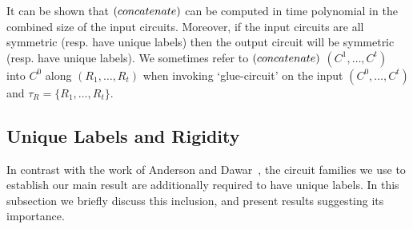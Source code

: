 \documentclass[../paper.tex]{subfiles}
\begin{document}

It can be shown that $\text{\upshape (} concatenate)$ can be computed in time polynomial in
the combined size of the input circuits. Moreover, if the input circuits are all
symmetric (resp. have unique labels) then the output circuit will be symmetric
(resp. have unique labels). We sometimes refer to $\text{\upshape (} concatenate)$ $(C^1,
\ldots, C^t)$ into $C^0$ along $(R_1 , \ldots , R_t)$ when invoking
`glue-circuit' on the input $(C^0, \ldots , C^t)$ and $\tau_R = \{R_1, \ldots ,
R_t\}$.

\subsection{Unique Labels and Rigidity}
In contrast with the work of Anderson and Dawar~\cite{}, the circuit families we
use to establish our main result are additionally required to have unique
labels. In this subsection we briefly discuss this inclusion, and present
results suggesting its importance.
\end{document}
